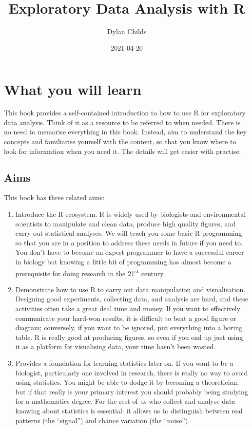 \documentclass[
]{book}
\title{Exploratory Data Analysis with R}
\author{Dylan Childs}
\date{2021-04-20}
\begin{document}
\maketitle

{
\setcounter{tocdepth}{1}
\tableofcontents
}
\hypertarget{what-you-will-learn}{%
\chapter*{What you will learn}\label{what-you-will-learn}}

This book provides a self-contained introduction to how to use R for exploratory data analysis. Think of it as a resource to be referred to when needed. There is no need to memorise everything in this book. Instead, aim to understand the key concepts and familiarise yourself with the content, so that you know where to look for information when you need it. The details will get easier with practise.

\hypertarget{aims}{%
\section*{Aims}\label{aims}}

This book has three related aims:

\begin{enumerate}
\def\labelenumi{\arabic{enumi}.}
\item
  Introduce the R ecosystem. R is widely used by biologists and environmental scientists to manipulate and clean data, produce high quality figures, and carry out statistical analyses. We will teach you some basic R programming so that you are in a position to address these needs in future if you need to. You don't have to become an expert programmer to have a successful career in biology but knowing a little bit of programming has almost become a prerequisite for doing research in the 21\textsuperscript{st} century.
\item
  Demonstrate how to use R to carry out data manipulation and visualisation. Designing good experiments, collecting data, and analysis are hard, and these activities often take a great deal time and money. If you want to effectively communicate your hard-won results, it is difficult to beat a good figure or diagram; conversely, if you want to be ignored, put everything into a boring table. R is really good at producing figures, so even if you end up just using it as a platform for visualising data, your time hasn't been wasted.
\item
  Provides a foundation for learning statistics later on. If you want to be a biologist, particularly one involved in research, there is really no way to avoid using statistics. You might be able to dodge it by becoming a theoretician, but if that really is your primary interest you should probably being studying for a mathematics degree. For the rest of us who collect and analyse data knowing about statistics is essential: it allows us to distinguish between real patterns (the ``signal'') and chance variation (the ``noise'').
\end{enumerate}
\end{document}
